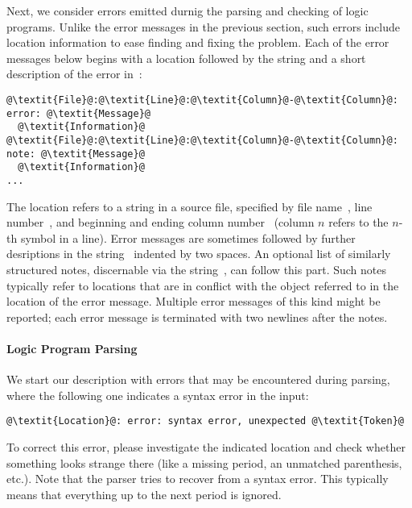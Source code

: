 Next, we consider errors emitted durnig the parsing and checking of logic programs.
Unlike the error messages in the previous section, 
such errors include location information to ease finding and fixing the problem.
Each of the error messages below begins with a location followed by the string  and a short description of the error in~:
\begin{lstlisting}[numbers=none,escapechar=@]
@\textit{File}@:@\textit{Line}@:@\textit{Column}@-@\textit{Column}@: error: @\textit{Message}@
  @\textit{Information}@
@\textit{File}@:@\textit{Line}@:@\textit{Column}@-@\textit{Column}@: note: @\textit{Message}@
  @\textit{Information}@
...

\end{lstlisting}
The location refers to a string in a source file,
specified by file name~,
line number~,
and beginning and ending column number~
(column $n$ refers to the $n$-th symbol in a line).
Error messages are sometimes followed by further desriptions in the string~ indented by two spaces.
An optional list of similarly structured notes, discernable via the string~, can follow this part.
Such notes typically refer to locations that are in conflict with the object referred to in the location of the error message.
Multiple error messages of this kind might be reported;
each error message is terminated with two newlines after the notes.

\paragraph{Logic Program Parsing}
We start our description with errors that may be encountered during parsing,
where the following one indicates a syntax error in the input:
%
\begin{lstlisting}[numbers=none,escapechar=@]
@\textit{Location}@: error: syntax error, unexpected @\textit{Token}@
\end{lstlisting}
%
To correct this error, please investigate the indicated location
and check whether something looks strange there
(like a missing period, an unmatched parenthesis, etc.).
Note that the parser tries to recover from a syntax error.
This typically means that everything up to the next period is ignored.

